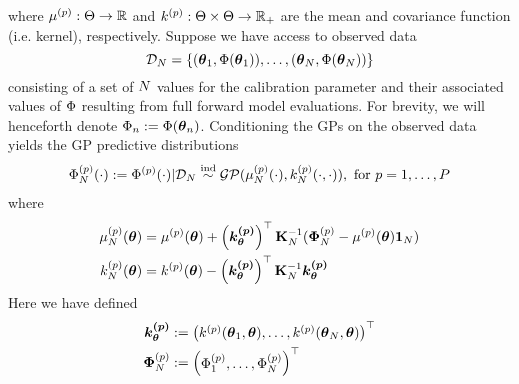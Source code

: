 \documentclass[12pt]{article}
\begin{document}
where $\mu^{(p)}: \Theta \to \mathbb{R}$ and $k^{(p)}: \Theta \times \Theta \to \mathbb{R}_+$ are the mean and covariance function (i.e. kernel), respectively. 
Suppose we have access to observed data 
\[\mathcal{D}_{N} = \left\{(\boldsymbol{\theta}_1, \Phi(\boldsymbol{\theta}_1)), \dots, (\boldsymbol{\theta}_{N}, \Phi(\boldsymbol{\theta}_{N})) \right\}\]
consisting of a set of $N$ values for the calibration parameter and their associated values of $\Phi$ resulting from full forward model evaluations. For brevity, we will henceforth denote 
$\Phi_{n} := \Phi(\boldsymbol{\theta}_{n})$. Conditioning the GPs on the observed data yields the GP predictive distributions
\begin{align} 
\Phi_{N}^{(p)}(\cdot) := \Phi^{(p)}(\cdot)|\mathcal{D}_{N} \overset{\text{ind}}{\sim} \mathcal{GP}(\mu_{N}^{(p)}(\cdot), k_{N}^{(p)}(\cdot, \cdot)), \text{ for } p = 1, \dots, P
\end{align}
where 
\begin{align}
\mu_{N}^{(p)}(\boldsymbol{\theta}) &= \mu^{(p)}(\boldsymbol{\theta}) + \left(\boldsymbol{k^{(p)}_{\boldsymbol{\theta}}}\right)^\top \mathbf{K}_{N}^{-1} (\boldsymbol{\Phi}_{N}^{(p)} - \mu^{(p)}(\boldsymbol{\theta}) \boldsymbol{1}_{N}) \\ 
k_{N}^{(p)}(\boldsymbol{\theta}) &= k^{(p)}(\boldsymbol{\theta}) - \left(\boldsymbol{k^{(p)}_{\boldsymbol{\theta}}}\right)^\top \mathbf{K}_{N}^{-1} \boldsymbol{k^{(p)}_{\boldsymbol{\theta}}}
\end{align}
Here we have defined 
\begin{align}
\boldsymbol{k^{(p)}_{\boldsymbol{\theta}}} &:= \begin{pmatrix} k^{(p)}(\boldsymbol{\theta}_1, \boldsymbol{\theta}), \dots, k^{(p)}(\boldsymbol{\theta}_{N}, \boldsymbol{\theta})  \end{pmatrix}^\top \\ 
\boldsymbol{\Phi}_{N}^{(p)} &:= \begin{pmatrix} \Phi_{1}^{(p)}, \dots, \Phi_{N}^{(p)} \end{pmatrix}^{\top}
\end{align}

\end{document}

